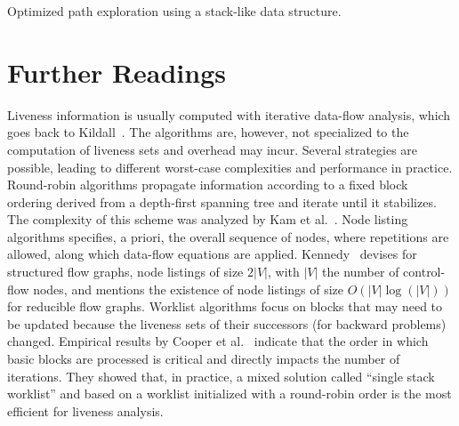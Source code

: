 \begin{algorithm}[h]
  \caption{Optimized path exploration using a stack-like data structure.}
  \label{alg:up_and_mark_stack}
\end{algorithm}




\section{Further Readings}
\label{sec:liveness:further}
Liveness information is usually computed with iterative
data-flow analysis, which goes back to Kildall~\cite{Kildall}. The algorithms are,
however, not specialized to the computation of liveness sets and overhead may
incur. Several strategies are possible, leading to
different worst-case complexities and performance in practice. Round-robin algorithms
propagate information according to a fixed block ordering derived from a
depth-first spanning tree and iterate until it stabilizes.  The complexity of
this scheme was analyzed by Kam et al.~\cite{novillo:bib:KU76}.  
Node listing algorithms specifies, a priori, the overall sequence of nodes, where repetitions are allowed, along which data-flow equations are applied.
Kennedy~\cite{Kennedy75} devises for structured flow graphs, node listings of size $2|V|$, with $|V|$ the number of control-flow nodes, and mentions the existence of node listings of size $O\left(|V| \log(|V|)\right)$ for reducible flow graphs.
Worklist algorithms focus on blocks that may need
to be updated because the liveness sets of their successors (for
backward problems) changed.
Empirical results by Cooper et al.~\cite{CHK06} indicate that the order in
which basic blocks are processed is critical and directly impacts the number of
iterations. They showed that, in practice, a mixed solution called ``single
stack worklist'' and based on a worklist initialized with a round-robin order is
the most efficient for liveness analysis. 

